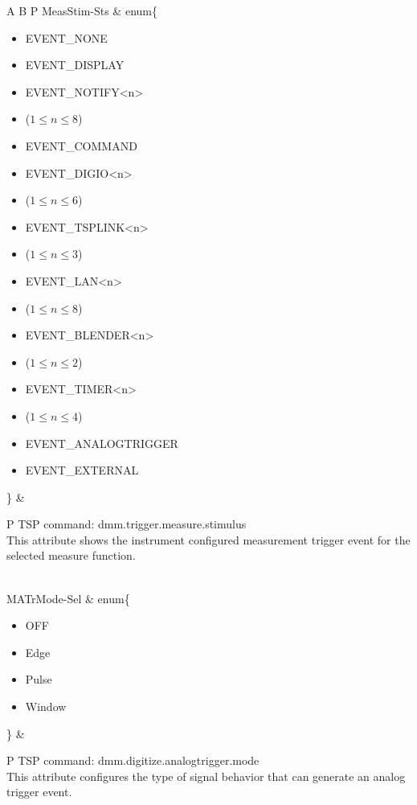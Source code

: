 \documentclass[openany]{article}
\begin{document}
\begin{longtable}{A B P}
		MeasStim-Sts & enum\{\begin{itemize}[noitemsep]
					\small
					\item[] EVENT\_NONE
					\item[] EVENT\_DISPLAY
					\item[] EVENT\_NOTIFY\textless n\textgreater
					\item[] ($1\leq n\leq 8$)
					\item[] EVENT\_COMMAND
					\item[] EVENT\_DIGIO\textless n\textgreater
					\item[] ($1\leq n\leq 6$)
					\item[] EVENT\_TSPLINK\textless n\textgreater
					\item[] ($1\leq n\leq 3$)
					\item[] EVENT\_LAN\textless n\textgreater
					\item[] ($1\leq n\leq 8$)
					\item[] EVENT\_BLENDER\textless n\textgreater
					\item[] ($1\leq n\leq 2$)
					\item[] EVENT\_TIMER\textless n\textgreater
					\item[] ($1\leq n\leq 4$)
					\item[] EVENT\_ANALOGTRIGGER
					\item[] EVENT\_EXTERNAL
				\end{itemize}\} & 
				\begin{tabular}{P}
					TSP command: dmm.trigger.measure.stimulus \\
					This attribute shows the instrument configured measurement trigger event for the selected measure function.
				\end{tabular} \\ \hline
		MATrMode-Sel & enum\{\begin{itemize}[noitemsep]
					\small
					\item[] OFF
					\item[] Edge
					\item[] Pulse
					\item[] Window
				\end{itemize}\} & 
				\begin{tabular}{P}
					TSP command: dmm.digitize.analogtrigger.mode \\
					This attribute configures the type of signal behavior that can generate an analog trigger event.
				\end{tabular} \\


\end{longtable}
\end{document}
